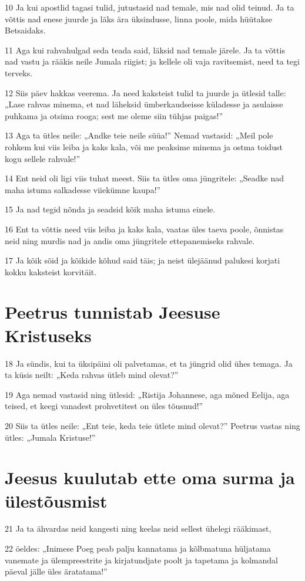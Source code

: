 \par 10 Ja kui apostlid tagasi tulid, jutustasid nad temale, mis nad olid teinud. Ja ta võttis nad enese juurde ja läks ära üksindusse, linna poole, mida hüütakse Betsaidaks.
\par 11 Aga kui rahvahulgad seda teada said, läksid nad temale järele. Ja ta võttis nad vastu ja rääkis neile Jumala riigist; ja kellele oli vaja ravitsemist, need ta tegi terveks.
\par 12 Siis päev hakkas veerema. Ja need kaksteist tulid ta juurde ja ütlesid talle: „Lase rahvas minema, et nad läheksid ümberkaudseisse küladesse ja asulaisse puhkama ja otsima rooga; sest me oleme siin tühjas paigas!”
\par 13 Aga ta ütles neile: „Andke teie neile süüa!” Nemad vastasid: „Meil pole rohkem kui viis leiba ja kaks kala, või me peaksime minema ja ostma toidust kogu sellele rahvale!”
\par 14 Ent neid oli ligi viis tuhat meest. Siis ta ütles oma jüngritele: „Seadke nad maha istuma salkadesse viiekümne kaupa!”
\par 15 Ja nad tegid nõnda ja seadsid kõik maha istuma einele.
\par 16 Ent ta võttis need viis leiba ja kaks kala, vaatas üles taeva poole, õnnistas neid ning murdis nad ja andis oma jüngritele ettepanemiseks rahvale.
\par 17 Ja kõik sõid ja kõikide kõhud said täis; ja neist ülejäänud palukesi korjati kokku kaksteist korvitäit.

\section*{Peetrus tunnistab Jeesuse Kristuseks}

\par 18 Ja sündis, kui ta üksipäini oli palvetamas, et ta jüngrid olid ühes temaga. Ja ta küsis neilt: „Keda rahvas ütleb mind olevat?”
\par 19 Aga nemad vastasid ning ütlesid: „Ristija Johannese, aga mõned Eelija, aga teised, et keegi vanadest prohvetitest on üles tõusnud!”
\par 20 Siis ta ütles neile: „Ent teie, keda teie ütlete mind olevat?” Peetrus vastas ning ütles: „Jumala Kristuse!”
\section*{Jeesus kuulutab ette oma surma ja ülestõusmist}

\par 21 Ja ta ähvardas neid kangesti ning keelas neid sellest ühelegi rääkimast,
\par 22 öeldes: „Inimese Poeg peab palju kannatama ja kõlbmatuna hüljatama vanemate ja ülempreestrite ja kirjatundjate poolt ja tapetama ja kolmandal päeval jälle üles äratatama!”

